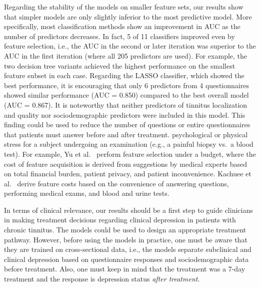 \documentclass[
  oneside]{book}
\begin{document}
Regarding the stability of the models on smaller feature sets, our results show that simpler models are only slightly inferior to the most predictive model.
More specifically, most classification methods show an improvement in AUC as the number of predictors decreases.
In fact, 5 of 11 classifiers improved even by feature selection, i.e., the AUC in the second or later iteration was superior to the AUC in the first iteration (where all 205 predictors are used).
For example, the two decision tree variants achieved the highest performance on the smallest feature subset in each case.
Regarding the LASSO classifier, which showed the best performance, it is encouraging that only 6 predictors from 4 questionnaires showed similar performance (AUC = 0.850) compared to the best overall model (AUC = 0.867).
It is noteworthy that neither predictors of tinnitus localization and quality nor sociodemographic predictors were included in this model.
This finding could be used to reduce the number of questions or entire questionnaires that patients must answer before and after treatment.
psychological or physical stress for a subject undergoing an examination (e.g., a painful biopsy vs.~a blood test).
For example, Yu et al.~\autocite{yu2020controlling} perform feature selection under a budget, where the cost of feature acquisition is derived from suggestions by medical experts based on total financial burden, patient privacy, and patient inconvenience.
Kachuee et al.~\autocite{kachuee2019costsensitive} derive feature costs based on the convenience of answering questions, performing medical exams, and blood and urine tests.

In terms of clinical relevance, our results should be a first step to guide clinicians in making treatment decisions regarding clinical depression in patients with chronic tinnitus.
The models could be used to design an appropriate treatment pathway.
However, before using the models in practice, one must be aware that they are trained on cross-sectional data, i.e., the models separate subclinical and clinical depression based on questionnaire responses and sociodemographic data before treatment.
Also, one must keep in mind that the treatment was a 7-day treatment and the response is depression status \emph{after treatment}.
\end{document}
